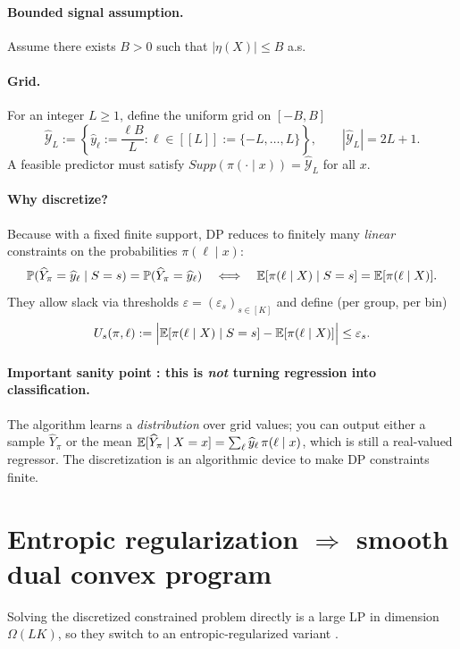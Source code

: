 \documentclass[11pt]{article}
\begin{document}
\paragraph{Bounded signal assumption.}
Assume there exists $B>0$ such that $|\eta(X)|\le B$ a.s.

\paragraph{Grid.}
For an integer $L\ge 1$, define the uniform grid on $[-B,B]$
\begin{equation}
\widehat{\mathcal Y}_L := \left\{ \widehat y_\ell := \frac{\ell B}{L} : \ell\in [[L]]:=\{-L,\ldots,L\}\right\},
\qquad |\widehat{\mathcal Y}_L|=2L+1.
\end{equation}
A feasible predictor must satisfy $Supp(\pi(\cdot\mid x))=\widehat{\mathcal Y}_L$ for all $x$.

\paragraph{Why discretize?}
Because with a fixed finite support, DP reduces to finitely many \emph{linear} constraints on the
probabilities $\pi(\ell\mid x)$:
\begin{equation}
\mathbb{P}(\widehat Y_\pi=\widehat y_\ell\mid S=s)=\mathbb{P}(\widehat Y_\pi=\widehat y_\ell)
\quad\Longleftrightarrow\quad
\mathbb{E}[\pi(\ell\mid X)\mid S=s]=\mathbb{E}[\pi(\ell\mid X)].
\end{equation}
They allow slack via thresholds $\varepsilon=(\varepsilon_s)_{s\in[K]}$ and define (per group, per bin)
\begin{equation}
U_s(\pi,\ell):=\Big|\mathbb{E}[\pi(\ell\mid X)\mid S=s]-\mathbb{E}[\pi(\ell\mid X)]\Big| \le \varepsilon_s.
\end{equation}

\paragraph{Important sanity point : this is \emph{not} turning regression into classification.}
The algorithm learns a \emph{distribution} over grid values; you can output either a sample
$\widehat Y_\pi$ or the mean $\mathbb{E}[\widehat Y_\pi\mid X=x]=\sum_{\ell} \widehat y_\ell\,\pi(\ell\mid x)$,
which is still a real-valued regressor. The discretization is an algorithmic device to make DP constraints finite.

\section{Entropic regularization $\Rightarrow$ smooth dual convex program}
Solving the discretized constrained problem directly is a large LP in dimension $\Omega(LK)$, so they
switch to an entropic-regularized variant .
\end{document}
